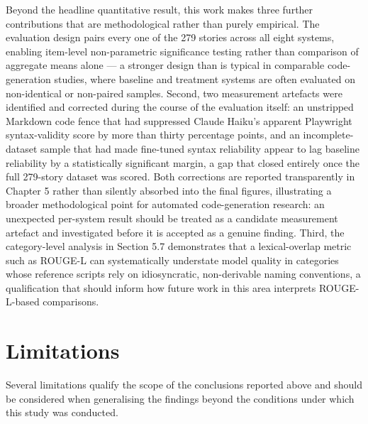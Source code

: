 Beyond the headline quantitative result, this work makes three further
contributions that are methodological rather than purely empirical. The
evaluation design pairs every one of the 279 stories across all eight
systems, enabling item-level non-parametric significance testing rather
than comparison of aggregate means alone --- a stronger design than is
typical in comparable code-generation studies, where baseline and
treatment systems are often evaluated on non-identical or non-paired
samples. Second, two measurement artefacts were identified and corrected
during the course of the evaluation itself: an unstripped Markdown code
fence that had suppressed Claude Haiku's apparent Playwright
syntax-validity score by more than thirty percentage points, and an
incomplete-dataset sample that had made fine-tuned syntax reliability
appear to lag baseline reliability by a statistically significant
margin, a gap that closed entirely once the full 279-story dataset was
scored. Both corrections are reported transparently in Chapter 5 rather
than silently absorbed into the final figures, illustrating a broader
methodological point for automated code-generation research: an
unexpected per-system result should be treated as a candidate
measurement artefact and investigated before it is accepted as a genuine
finding. Third, the category-level analysis in Section 5.7 demonstrates
that a lexical-overlap metric such as ROUGE-L can systematically
understate model quality in categories whose reference scripts rely on
idiosyncratic, non-derivable naming conventions, a qualification that
should inform how future work in this area interprets ROUGE-L-based
comparisons.

\section{Limitations}

Several limitations qualify the scope of the conclusions reported above
and should be considered when generalising the findings beyond the
conditions under which this study was conducted.

